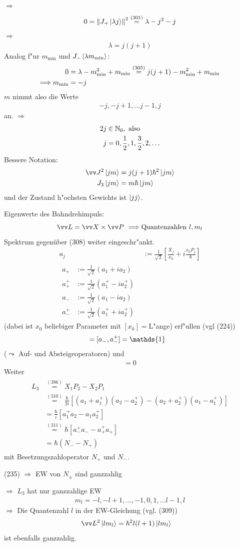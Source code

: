 \documentclass[a4paper]{scrartcl}
\newcommand{\NN}{\ensuremath \mathbb{N}}
\newcommand{\dOne}{\ensuremath \mathds{1}}
\newcommand{\eqn}[1]{\begin{align} #1 \end{align}}
\newcommand{\eqnnon}[1]{\begin{align*} #1 \end{align*}}
\newcommand{\spl}[1]{\begin{split} #1 \end{split}}
\begin{document}
{$\Longrightarrow$
\eqnnon{0 = \left\Vert J_+ \ket{ \lambda j } \right\Vert^2 \stackrel{(301)}= \lambda - j^2 - j}
$\Longrightarrow$
\eqn{ \lambda = j(j+1)}
Analog f"ur $m_{\mathrm{min}}$ und $J_- \Ket{ \lambda m_{\mathrm{min}}}$:
\eqn{
0 & = \lambda - m_{\mathrm{min}}^2 + m_{\mathrm{min}} \stackrel{(305)}= j(j+1) - m_{\mathrm{min}}^2 + m_{\mathrm{min}} \notag \\
\Longrightarrow m_{\mathrm{min}} &= - j
}
$m$ nimmt also die Werte
\eqn{-j, -j+1, \ldots j-1, j}
an. $\Longrightarrow$
\eqn{
\begin{split}
2j & \in \NN_0, \mathrm{ \ also} \\
j & =0, \frac12, 1, \frac32, 2, \ldots
\end{split}
}
Bessere Notation:
\eqn{
\spl{
\vv J^2 \Ket{jm} & = j(j+1) \hbar^2 \Ket{jm} \\
J_3 \Ket{jm} & = m \hbar \Ket{ j m }
}
}
und der Zustand h"ochsten Gewichts ist $\Ket{ jj}$.

Eigenwerte des Bahndrehimpuls:
$$ \vv L = \vv X \times \vv P \ \Longrightarrow \mathrm{Quantenzahlen \ } l, m_l$$
Spektrum gegenüber (308) weiter eingeschr"ankt.
\eqn{
a_j & := \frac1{\sqrt 2} \left[ \frac{X_j}{x_0} + i \frac{x_0 P_j}\hbar \right] \\
\spl{
a_+ &:= \frac1{\sqrt2} (a_1 + i a_2) \\
a_+^+ & := \frac1{\sqrt2} (a_1^+ - i a_2^+) \\
a_- & := \frac1{\sqrt2} (a_1 - i a_2) \\
a_-^+ & := \frac1{\sqrt2} (a_1^+  + i a_2^+)
}
}
(dabei ist $x_0$ beliebiger Parameter mit $[x_0] = $L"ange) erf"ullen (vgl (224))
\eqn{ [a_+, a_+^+] & = [a_-, a_-^+] = \dOne}
($\leadsto$ Auf- und Absteigeoperatoren) und
\eqn{ [a_+, a_-] = 0}
Weiter
\eqn{
\spl{
L_3 & \stackrel{(386)}= X_1 P_2 - X_2 P_1 \\
& \stackrel{(310)}= \frac \hbar {2i} \left[ (a_1 + a_1^+) (a_2 - a_2^+) - (a_2 + a_2^+) (a_1 - a_1^+) \right] \\
& = \frac \hbar i [a_1 ^+ a_2 - a_1 a_2^+] \\
& \stackrel{(311)}= \hbar [a_-^ + a_- - a_+^+ a_+ ] \\
& = \hbar (N_- - N_+)
}
}
mit Besetzungszahloperator $N_+$ und $N_-$.

(235) $\Longrightarrow$ EW von $N_\pm$ sind ganzzahlig

$\Longrightarrow$ $L_3$ hat nur ganzzahlige EW
\eqn{ m_l = -l, -l+1, \ldots, -1, 0, 1, \ldots l-1, l}
$\Longrightarrow$ Die Quantenzahl $l$ in der EW-Gleichung (vgl. (309))
\eqn{ \vv L^2 \Ket{ l m_l } & = \hbar^2 l(l+1) \Ket{ l m_l }}
ist ebenfalls ganzzahlig.

}
\end{document}
